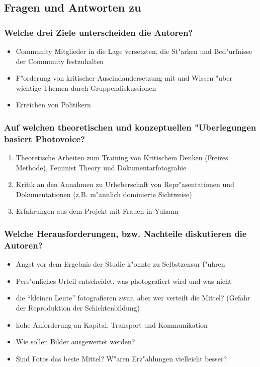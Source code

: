 \subsection{Fragen und Antworten zu \textcite{wang_photovoice:_1997}}
\subsubsection{Welche drei Ziele unterscheiden die Autoren?}
\begin{itemize}
        \item Community Mitglieder in die Lage versetzten, die St"arken und Bed"urfnisse der Community festzuhalten
        \item F"orderung von kritischer Auseindandersetzung mit und Wissen "uber wichtige Themen durch Gruppendiskussionen
        \item Erreichen von Politikern
\end{itemize}

\subsubsection{Auf welchen theoretischen und konzeptuellen "Uberlegungen basiert Photovoice?}
\begin{enumerate}
        \item Theoretische Arbeiten zum Training von Kritischem Denken (Freires Methode), Feminist Theory und Dokumentarfotograhie
        \item Kritik an den Annahmen zu Urheberschaft von Repr"asentationen und Dokumentationen (z.B. m"annlich dominierte Sichtweise)
        \item Erfahrungen aus dem Projekt mit Frauen in Yuhann
\end{enumerate}

\subsubsection{Welche Herausforderungen, bzw. Nachteile diskutieren die Autoren?}
\begin{itemize}
        \item Angst vor dem Ergebnis der Studie k"onnte zu Selbstzensur f"uhren
        \item Pers"onliches Urteil entscheidet, was photografiert wird und was nicht
        \item die ``kleinen Leute'' fotografieren zwar, aber wer verteilt die Mittel? (Gefahr der Reproduktion der Schichtenbildung)
        \item hohe Anforderung an Kapital, Transport und Kommunikation
        \item Wie sollen Bilder ausgewertet werden?
        \item Sind Fotos das beste Mittel? W"aren Erz"ahlungen vielleicht besser?
\end{itemize}

